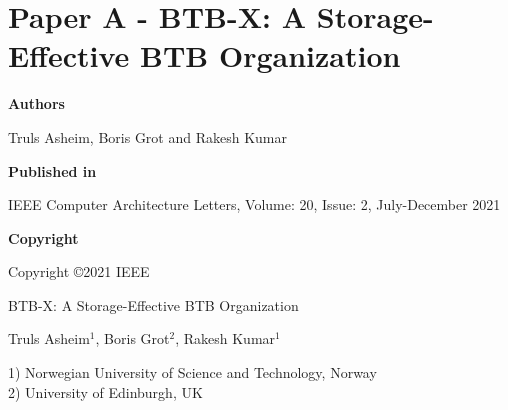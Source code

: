 \documentclass[../../../main.tex]{subfiles}
\begin{document}
\chapter{Paper A - BTB-X: A Storage-Effective BTB Organization}
\label{chap:cal-paper}

\noindent \textbf{Authors}

\vspace*{0.3cm}

\noindent Truls Asheim, Boris Grot and Rakesh Kumar

\vspace*{0.7cm}

\noindent \textbf{Published in}

\vspace*{0.3cm}

\noindent IEEE Computer Architecture Letters, Volume: 20, Issue: 2, July-December 2021

\vspace*{0.7cm}

\noindent \textbf{Copyright}

\vspace*{0.3cm}

\noindent Copyright ©2021 IEEE

\newpage

\vspace*{0.1cm}

\begin{center}

\Huge{BTB-X: A Storage-Effective BTB Organization}

\vspace{0.6cm}

\large{Truls Asheim$^{1}$, Boris Grot$^{2}$, Rakesh Kumar$^{1}$}

\vspace{0.1cm}

\small{1) Norwegian University of Science and Technology, Norway}\\
\small{2) University of Edinburgh, UK}


\end{center}

\vspace{0.2cm}
\end{document}
